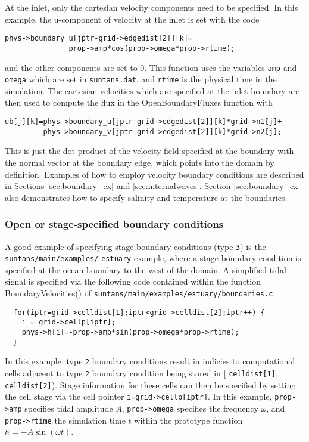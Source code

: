 At the inlet, only the cartesian velocity components need to be specified.  In this example,
the u-component of velocity at the inlet is set with the code
\begin{verbatim}
phys->boundary_u[jptr-grid->edgedist[2]][k]=
               prop->amp*cos(prop->omega*prop->rtime);
\end{verbatim}
and the other components are set to 0.  This function uses the variables \verb+amp+ and \verb+omega+
which are set in \verb+suntans.dat+, and \verb+rtime+ is the physical time in the simulation.
The cartesian velocities which are specified at the inlet boundary are then used to compute
the flux in the OpenBoundaryFluxes function with
\begin{verbatim}
ub[j][k]=phys->boundary_u[jptr-grid->edgedist[2]][k]*grid->n1[j]+
         phys->boundary_v[jptr-grid->edgedist[2]][k]*grid->n2[j];
\end{verbatim}
This is just the dot product of the velocity field specified at the boundary with the
normal vector at the boundary edge, which points into the domain by definition.
Examples of how to employ velocity boundary conditions are described in Sections \ref{sec:boundary_ex}
and \ref{sec:internalwaves}.  Section \ref{sec:boundary_ex} also demonstrates 
how to specify salinity and temperature at the boundaries.

\subsubsection{Open or stage-specified boundary conditions}

A good example of specifying stage boundary conditions (type \verb+3+) is the 
\verb+suntans/main/examples/+ \verb+estuary+ example,
where a stage boundary condition is specified at the ocean boundary to the west of the domain.
A simplified tidal signal is specified via the following code contained within the function 
BoundaryVelocities() of \verb+suntans/main/examples/estuary/boundaries.c+.

\begin{verbatim}
  for(iptr=grid->celldist[1];iptr<grid->celldist[2];iptr++) {
    i = grid->cellp[iptr];
    phys->h[i]=-prop->amp*sin(prop->omega*prop->rtime);
  }
\end{verbatim}

In this example, type \verb+2+ boundary conditions result in indicies to computational cells adjacent
to type \verb+2+ boundary condition being stored in [ \verb+celldist[1]+, \verb+celldist[2]+).  
Stage information for these cells can then be specified by setting the cell stage via the cell pointer
\verb+i=grid->cellp[iptr]+.  In this example, \verb+prop->amp+ specifies tidal amplitude $A$, 
\verb+prop->omega+ specifies the frequency $\omega$, and \verb+prop->rtime+ the simulation time $t$ within
the prototype function $h = -A\sin\left(\omega t\right)$.

